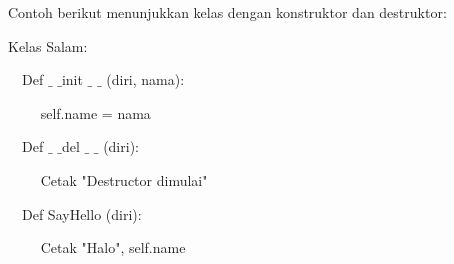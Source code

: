 \documentclass[a4paper,12pt]{report}
\begin{document}
\noindent 
Contoh berikut menunjukkan kelas dengan konstruktor dan destruktor: \par
\noindent 
\vspace{12pt}
\noindent 
\vspace{12pt}
\noindent 
{\fontsize{10pt}{10pt}\selectfont Kelas Salam:} \par
\noindent 
{\fontsize{10pt}{10pt}\selectfont  $  $ $  $ $  $ $  $Def  $  \_  $ $  \_  $init  $  \_  $ $  \_  $ (diri, nama):} \par
\noindent 
{\fontsize{10pt}{10pt}\selectfont  $  $ $  $ $  $ $  $ $  $ $  $ $  $ $  $self.name = nama} \par
\noindent 
{\fontsize{10pt}{10pt}\selectfont  $  $ $  $ $  $ $  $Def  $  \_  $ $  \_  $del  $  \_  $ $  \_  $ (diri):} \par
\noindent 
{\fontsize{10pt}{10pt}\selectfont  $  $ $  $ $  $ $  $ $  $ $  $ $  $ $  $Cetak "Destructor dimulai"} \par
\noindent 
{\fontsize{10pt}{10pt}\selectfont  $  $ $  $ $  $ $  $Def SayHello (diri):} \par
\noindent 
{\fontsize{10pt}{10pt}\selectfont  $  $ $  $ $  $ $  $ $  $ $  $ $  $ $  $Cetak "Halo", self.name} \par
\vspace{12pt}
\end{document}
